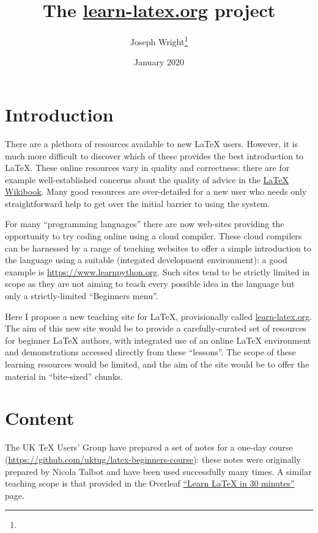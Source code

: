 \documentclass{article}
\author{Joseph Wright\thanks{\email{joseph.wright@morningstar2.co.uk}}}
\date{January 2020}
\title{The \url{learn-latex.org} project}
\begin{document}
\maketitle

\section{Introduction}

There are a plethora of resources available to new \LaTeX{} users. However, it
is much more difficult to discover which of these provides the best
introduction to \LaTeX{}. These online resources vary in quality and
correctness: there are for example well-established concerns about the quality
of advice in the \href{https://en.wikibooks.org/wiki/LaTeX}{\LaTeX{} Wikibook}.
Many good resources are over-detailed for a new user who needs only
straightforward help to get over the initial barrier to using the system.

For many \enquote{programming languages} there are now web-sites providing the
opportunity to try coding online using a cloud compiler. These cloud compilers
can be harnessed by a range of teaching websites to offer a simple introduction
to the language using a suitable  (integated development
environment): a good example is \url{https://www.learnpython.org}. Such sites
tend to be strictly limited in scope as they are not aiming to teach every
possible idea in the language but only a strictly-limited \enquote{Beginners
menu}.

Here I propose a new teaching site for \LaTeX{}, provisionally called
\url{learn-latex.org}. The aim of this new site would be to provide a
carefully-curated set of resources for beginner \LaTeX{} authors, with
integrated use of an online \LaTeX{} environment and demonstrations accessed
directly from these \enquote{lessons}. The scope of these learning resources
would be limited, and the aim of the site would be to offer the material in
\enquote{bite-sized} chunks.

\section{Content}

The UK \TeX{} Users' Group have prepared a set of notes for a one-day course
(\url{https://github.com/uktug/latex-beginners-course}): these notes were
originally prepared by Nicola Talbot and have been used successfully many
times. A similar teaching scope is that provided in the Overleaf
\href{https://www.overleaf.com/learn/latex/Learn_LaTeX_in_30_minutes}{\enquote{Learn
\LaTeX{} in 30 minutes}} page.
\end{document}
